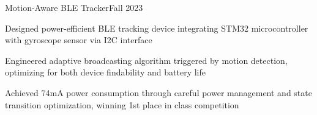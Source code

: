 \begin{joblong}{Motion-Aware BLE Tracker}{Fall 2023}
	\item Designed power-efficient BLE tracking device integrating STM32 microcontroller with gyroscope sensor via I2C interface
	\item Engineered adaptive broadcasting algorithm triggered by motion detection, optimizing for both device findability and battery life
	\item Achieved 74mA power consumption through careful power management and state transition optimization, winning 1st place in class competition
\end{joblong}
